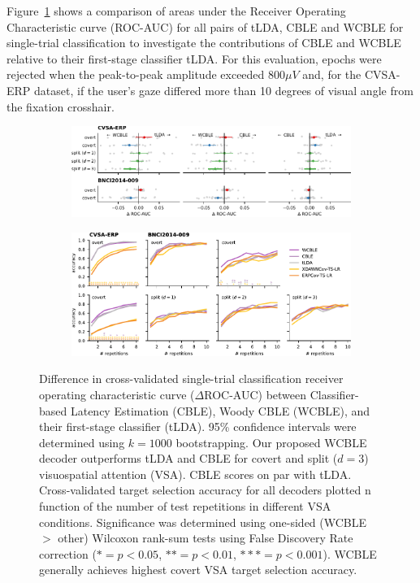 Figure~\ref{fig:single_trial_roc_auc_diff} shows a comparison of areas under the
Receiver Operating Characteristic curve (ROC-AUC) for all pairs of tLDA, CBLE
and WCBLE for single-trial classification to investigate the contributions of
CBLE and WCBLE relative to their first-stage classifier tLDA.
For this evaluation, epochs were rejected when the peak-to-peak amplitude
exceeded 800$\mu V$ and, for the CVSA-ERP dataset, if the user's gaze differed more than
10 degrees of visual angle from the fixation crosshair.
\begin{figure}
  \bigskip
	\begin{subfigure}{\linewidth}
		\caption{}
		\label{fig:single_trial_roc_auc_diff}
		\includegraphics[width=\linewidth]{figures/covert_align/figure4a.pdf}
	\end{subfigure}

	\bigskip

	\begin{subfigure}{\linewidth}
		\caption{}
		\label{fig:block_evaluation}
		\includegraphics[width=\linewidth]{figures/covert_align/figure4b.pdf}
	\end{subfigure}
	\caption{
		 Difference in cross-validated
    single-trial classification receiver operating characteristic curve ($\Delta$ROC-AUC)
    between Classifier-based Latency Estimation (CBLE), Woody
    CBLE (WCBLE),	and their first-stage classifier (tLDA).
    95\% confidence intervals were determined using $k=1000$ bootstrapping.
    Our proposed WCBLE decoder outperforms tLDA and CBLE for covert and split
		($d=3$)	visuospatial attention (VSA). CBLE scores on par with tLDA.
		 Cross-validated target selection accuracy for
    all decoders plotted n function of the number of test repetitions in
    different VSA conditions. Significance was determined using one-sided
    (WCBLE $>$ other) Wilcoxon rank-sum tests using False Discovery Rate correction
    ($*= p<0.05$, $**=p<0.01$, $***=p<0.001$). WCBLE generally achieves highest
    covert VSA target selection accuracy.}
\end{figure}
